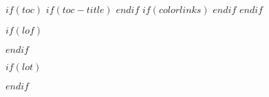 
$if(toc)$
  $if(toc-title)$
  \renewcommand*\contentsname{$toc-title$}
  $endif$
  $if(colorlinks)$
    \hypersetup{linkcolor=$if(toccolor)$$toccolor$$else$$endif$}
  $endif$
  \setcounter{tocdepth}{$toc-depth$}
  \tableofcontents
  \newpage
$endif$

$if(lof)$
  \listoffigures
  \newpage
$endif$

$if(lot)$
  \listoftables
  \newpage
$endif$
